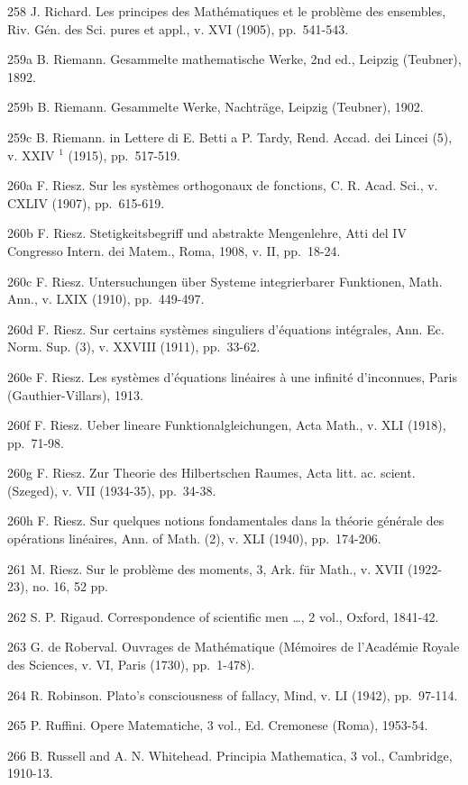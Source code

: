 258 J. Richard. Les principes des Mathématiques et le problème des ensembles, Riv. Gén. des Sci. pures et appl., v. XVI (1905), pp.~541-543.

259a B. Riemann. Gesammelte mathematische Werke, 2nd ed., Leipzig (Teubner), 1892.

259b B. Riemann. Gesammelte Werke, Nachträge, Leipzig (Teubner), 1902.

259c B. Riemann. in Lettere di E. Betti a P. Tardy, Rend. Accad. dei Lincei (5), v. XXIV \(^{1}\) (1915), pp.~517-519.

260a F. Riesz. Sur les systèmes orthogonaux de fonctions, C. R. Acad. Sci., v. CXLIV (1907), pp.~615-619.

260b F. Riesz. Stetigkeitsbegriff und abstrakte Mengenlehre, Atti del IV Congresso Intern. dei Matem., Roma, 1908, v. II, pp.~18-24.

260c F. Riesz. Untersuchungen über Systeme integrierbarer Funktionen, Math. Ann., v. LXIX (1910), pp.~449-497.

260d F. Riesz. Sur certains systèmes singuliers d'équations intégrales, Ann. Ec. Norm. Sup. (3), v. XXVIII (1911), pp.~33-62.

260e F. Riesz. Les systèmes d'équations linéaires à une infinité d'inconnues, Paris (Gauthier-Villars), 1913.

260f F. Riesz. Ueber lineare Funktionalgleichungen, Acta Math., v. XLI (1918), pp.~71-98.

260g F. Riesz. Zur Theorie des Hilbertschen Raumes, Acta litt. ac. scient. (Szeged), v. VII (1934-35), pp.~34-38.

260h F. Riesz. Sur quelques notions fondamentales dans la théorie générale des opérations linéaires, Ann. of Math. (2), v. XLI (1940), pp.~174-206.

261 M. Riesz. Sur le problème des moments, 3, Ark. für Math., v. XVII (1922-23), no. 16, 52 pp.

262 S. P. Rigaud. Correspondence of scientific men \ldots, 2 vol., Oxford, 1841-42.

263 G. de Roberval. Ouvrages de Mathématique (Mémoires de l'Académie Royale des Sciences, v. VI, Paris (1730), pp.~1-478).

264 R. Robinson. Plato's consciousness of fallacy, Mind, v. LI (1942), pp.~97-114.

265 P. Ruffini. Opere Matematiche, 3 vol., Ed. Cremonese (Roma), 1953-54.

266 B. Russell and A. N. Whitehead. Principia Mathematica, 3 vol., Cambridge, 1910-13.

